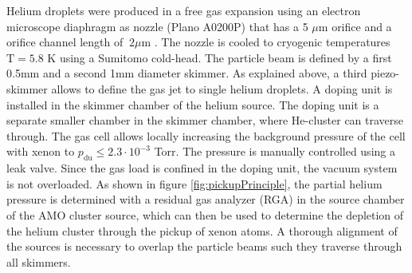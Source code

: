 Helium droplets were produced in a free gas expansion using an electron microscope diaphragm as nozzle (Plano A0200P) that has a 5 $\mu$m orifice and a orifice channel length of $~2 \mu$m  \citep{Gomez-2011-JCP}. The nozzle is cooled to cryogenic temperatures $\text{T}= 5.8$ K using a Sumitomo cold-head. The particle beam is defined by a first 0.5mm and a second 1mm diameter skimmer. As explained above, a third piezo-skimmer allows to define the gas jet to single helium droplets. A doping unit is installed in the skimmer chamber of the helium source. The doping unit is a separate smaller chamber in the skimmer chamber, where He-cluster can traverse through. The gas cell allows locally increasing the background pressure of the cell with xenon to $p_{\text{du}}\leq 2.3\cdot 10^{-3}$ Torr. The pressure is manually controlled using a leak valve. Since the gas load is confined in the doping unit, the vacuum system is not overloaded. As shown in figure \ref{fig:pickupPrinciple}, the partial helium pressure is determined with a residual gas analyzer (RGA) in the source chamber of the AMO cluster source, which can then be used to determine the depletion of the helium cluster through the pickup of xenon atoms. A thorough alignment of the sources is necessary to overlap the particle beams such they traverse through all skimmers.%
%
%
%
